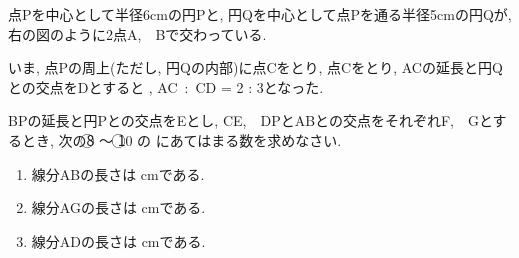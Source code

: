 \documentclass[dvipdfmx, titlepage, 11pt]{jsarticle}
\begin{document}
\begin{multicols}{2}
  \noindent {}\hspace{10pt} 点Pを中心として半径6cmの円Pと, 円Qを中心として点Pを通る半径5cmの円Qが, 右の図のように2点A,\ \ Bで交わっている.

  いま, 点Pの周上(ただし, 円Qの内部)に点Cをとり, 点Cをとり, ACの延長と円Qとの交点をDとすると
  , AC\ :\ CD = 2 : 3となった.

  BPの延長と円Pとの交点をEとし, CE,\ \ DPとABとの交点をそれぞれF,\ \ Gとするとき, 次の\textcircled{\scriptsize 8} 〜 \textcircled{\scriptsize 10} の \fbox{　\hspace{10pt} } にあてはまる数を求めなさい.

  \begin{center}
  \end{center}
\end{multicols}

\begin{enumerate}[(1)]
\item 線分ABの長さは  cmである.\\[2cm]
\item 線分AGの長さは  cmである.\\[2cm]
\item 線分ADの長さは  cmである.
\end{enumerate}
\newpage
\end{document}
